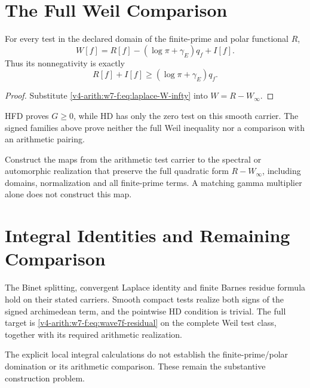 \section{The Full Weil Comparison}
\label{v4-arith:w7-f:irreducible}
\begin{proposition}
\label{v4-arith:w7-f:thm:residual}
For every test in the declared domain of the finite-prime and polar
functional \(R\),
\begin{equation}
\label{v4-arith:w7-f:eq:combined-closure}
 W[f]=R[f]-(\log\pi+\gamma_E)q_f+I[f].
\end{equation}
Thus its nonnegativity is exactly
\begin{equation}
\label{v4-arith:w7-f:eq:wave7f-residual}
 R[f]+I[f]\ge(\log\pi+\gamma_E)q_f.
\end{equation}
\end{proposition}
\begin{proof}
Substitute \eqref{v4-arith:w7-f:eq:laplace-W-infty} into
\(W=R-W_\infty\).
\end{proof}
\begin{remark}
\label{v4-arith:w7-f:rem:residual-spectral}
HFD proves \(G\ge0\), while HD has only the zero test on this
smooth carrier. The signed families above prove neither the full
Weil inequality nor a comparison with an arithmetic pairing.
\end{remark}
\begin{question}
\label{v4-arith:w7-f:rem:HB-relation}
Construct the maps from the arithmetic test carrier to the spectral
or automorphic realization that preserve the full quadratic form
\(R-W_\infty\), including domains, normalization and all finite-prime
terms. A matching gamma multiplier alone does not construct this map.
\end{question}
\section{Integral Identities and Remaining Comparison}
\label{v4-arith:w7-f:summary}
The Binet splitting, convergent Laplace identity and finite Barnes
residue formula hold on their stated carriers. Smooth compact tests
realize both signs of the signed archimedean term, and the pointwise
HD condition is trivial. The full target is
\eqref{v4-arith:w7-f:eq:wave7f-residual} on the complete Weil test
class, together with its required arithmetic realization.
\begin{remark}
\label{v4-arith:w7-f:rem:beilinson-closing}
The explicit local integral calculations do not establish the
finite-prime/polar domination or its arithmetic comparison. These
remain the substantive construction problem.
\end{remark}
